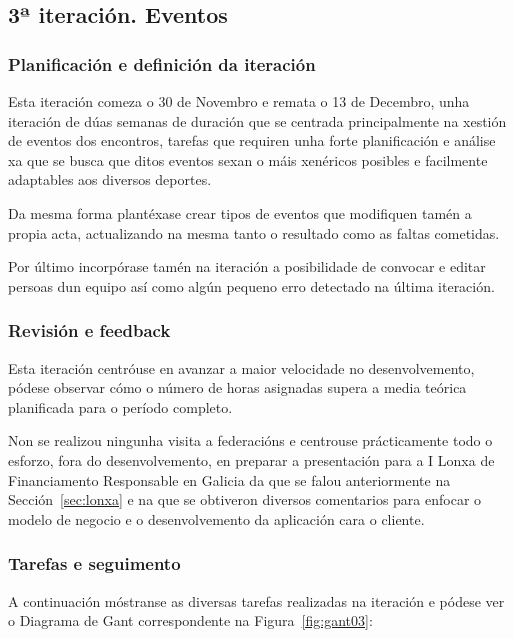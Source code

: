     \subsection{3ª iteración. Eventos}

      \subsubsection{Planificación e definición da iteración}
      Esta iteración comeza o 30 de Novembro e remata o 13 de Decembro, unha 
iteración de dúas semanas de duración que se centrada principalmente na xestión 
de eventos dos encontros, tarefas que requiren unha forte planificación e 
análise xa que se busca que ditos eventos sexan o máis xenéricos posibles e 
facilmente adaptables aos diversos deportes.

      Da mesma forma plantéxase crear tipos de eventos que modifiquen tamén a 
propia acta, actualizando na mesma tanto o resultado como as faltas cometidas.

      Por último incorpórase tamén na iteración a posibilidade de convocar e 
editar persoas dun equipo así como algún pequeno erro detectado na última 
iteración.

      \subsubsection{Revisión e feedback}
      Esta iteración centróuse en avanzar a maior velocidade no 
desenvolvemento, pódese observar cómo o número de horas asignadas supera a 
media teórica planificada para o período completo.

      Non se realizou ningunha visita a federacións e centrouse prácticamente 
todo o esforzo, fora do desenvolvemento, en preparar a presentación para a I 
Lonxa de Financiamento Responsable en Galicia da que se falou 
anteriormente na Sección~\ref{sec:lonxa} e na que se obtiveron diversos 
comentarios para enfocar o modelo de negocio e o desenvolvemento da aplicación 
cara o cliente.

      \subsubsection{Tarefas e seguimento}

      A continuación móstranse as diversas tarefas realizadas na iteración e 
pódese ver o Diagrama de Gant correspondente na Figura~\ref{fig:gant03}:


